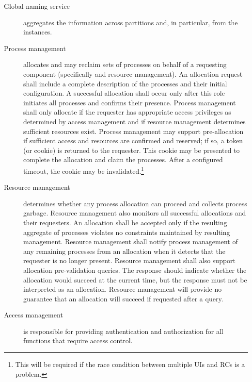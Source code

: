 \begin{description}
\item[Global naming service] aggregates the  information across partitions and, in particular, from the  instances.

\item[Process management] allocates and may reclaim sets of processes on behalf of a requesting component (specifically  and resource management). 
  An allocation request shall include a complete description of the processes and their initial configuration. 
  A successful allocation shall occur only after this role initiates all processes and confirms their presence. 
  Process management shall only allocate  if the requester has appropriate access privileges as determined by access management and if resource management determines sufficient resources exist. 
  Process management may support pre-allocation if sufficient access and resources are confirmed and reserved; if so, a token (or cookie) is returned to the requester. 
  This cookie may be presented to complete the allocation and claim the processes. 
  After a configured timeout, the cookie may be invalidated.\footnote{This will be required if the race condition between multiple UIs and RCs is a problem.}  
  
\item[Resource management] determines whether any process allocation can proceed and collects process garbage. 
  Resource management also monitors all successful allocations and their requesters.  
  An allocation shall be accepted only if the resulting aggregate of processes violates no constraints maintained by resulting management. 
  Resource management shall notify process management of any remaining processes from an allocation when it detects that the requester is no longer present.
  Resource management shall also support allocation pre-validation queries. 
  The response should indicate whether the allocation would succeed at the current time, but the response must not be interpreted as an allocation. 
  Resource management will provide no guarantee that an allocation will succeed if requested after a query.

  
\item[Access management] is responsible for providing authentication and authorization for all  functions that require access control.  

\end{description}

